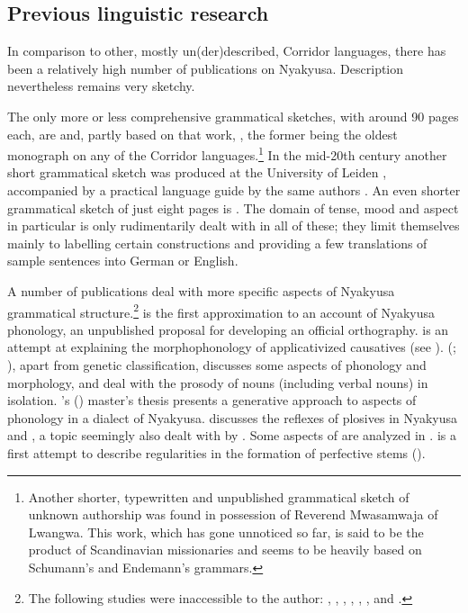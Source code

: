 \subsection{Previous linguistic research}\label{ResearchHistory}
In comparison to other, mostly un(der)described, Corridor languages, there has been a relatively high number of publications on Nyakyusa. Description nevertheless remains very sketchy.

The only more or less comprehensive grammatical sketches, with around 90 pages each, are \citet{SchumannK1899} and, partly based on that work, \citet{EndemannK1900}, the former being the oldest monograph on any of the Corridor languages.\footnote{Another shorter, typewritten and unpublished grammatical sketch of unknown authorship was found in possession of Reverend Mwasamwaja of Lwangwa. This work, which has gone unnoticed so far, is said to be the product of Scandinavian missionaries and seems to be heavily based on Schumann's and Endemann's grammars.} In the mid-20th century another short grammatical sketch was produced at the University of Leiden \citep{MwangokaNVoorhoeveJ1960b}, accompanied by a practical language guide by the same authors \citep{MwangokaNVoorhoeveJ1960}. An even shorter grammatical sketch of just eight pages is \citet{NurseD1979}. The domain of tense, mood and aspect in particular is only rudimentarily dealt with in all of these; they limit themselves mainly to labelling certain constructions and providing a few translations of sample sentences into German or English. 

A number of publications deal with more specific aspects of Nyakyusa grammatical structure.\footnote{The following studies were inaccessible to the author: \citet{Anonym1939}, \citet{BusseJnd}, \citet{DurantiA1977}, \citet{HawkinsonA1976}, \citet{Konter-KataniM1988}, \citet{LusekeloA2010}, \citet{MeyerT1919} and \citet{MulindaM1997}.}
\citet{MeinhofC1966} is the first approximation to an account of Nyakyusa phonology, \citet{MeyerT1919} an unpublished proposal for developing an official orthography. \citet{EndemannK1900} is an attempt at explaining the morphophonology of applicativized causatives (see ).
\citeauthor{LabroussiC1998} (\citeyear{LabroussiC1998}; \citeyear{LabroussiC1999}), apart from genetic classification, discusses some aspects of phonology and morphology, and \citet{vanEssenOKaehler-MeyerE1969} deal with the prosody of nouns (including verbal nouns) in isolation. \citeauthor{MethodS2008}'s (\citeyear{MethodS2008}) master's thesis presents a generative approach to aspects of phonology in a dialect of Nyakyusa. \citet{Konter-KataniM1989} discusses the reflexes of  plosives in Nyakyusa and , a topic seemingly also dealt with by \citet{MulindaM1997}. Some aspects of  are analyzed in \citet{LusekeloA2009}. \citet{BergerP1938} is a first attempt to describe regularities in the formation of perfective stems ().

